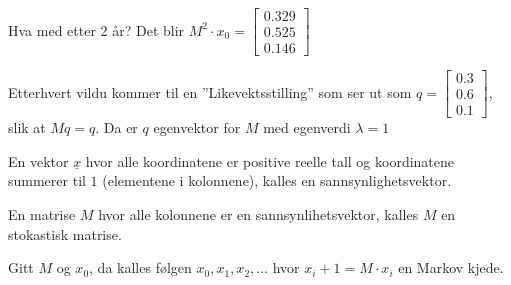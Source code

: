\documentclass[11pt, a4paper, norsk]{article}
\begin{document}
\begin{Example}{}{}
            Hva med etter 2 år? Det blir $M^2 \cdot x_0 = \begin{bmatrix}
                0.329 \\
                0.525 \\
                0.146
            \end{bmatrix}$


            Etterhvert vildu kommer til en ''Likevektsstilling'' som ser ut som $q = \begin{bmatrix}
                0.3 \\
                0.6 \\
                0.1
            \end{bmatrix}$, slik at $Mq = q$. Da er $q$ egenvektor for $M$ med egenverdi $\lambda = 1$
        \end{Example}
        
        \begin{Definition}{}{}
            En vektor $\underline{x}$ hvor alle koordinatene er positive reelle tall og koordinatene summerer til $1$ (elementene i kolonnene), kalles en sannsynlighetsvektor. 
        \end{Definition}
        
        \begin{Definition}{}{}
            En matrise $M$ hvor alle kolonnene er en sannsynlihetsvektor, kalles $M$ en stokastisk matrise. 
        \end{Definition}

        \begin{Definition}{}{}
            Gitt $M$ og $x_0$, da kalles følgen $x_0, x_1, x_2, \dots$ hvor $x_{i} + 1 = M \cdot x_{i}$ en Markov kjede. 
        \end{Definition}
\end{document}

